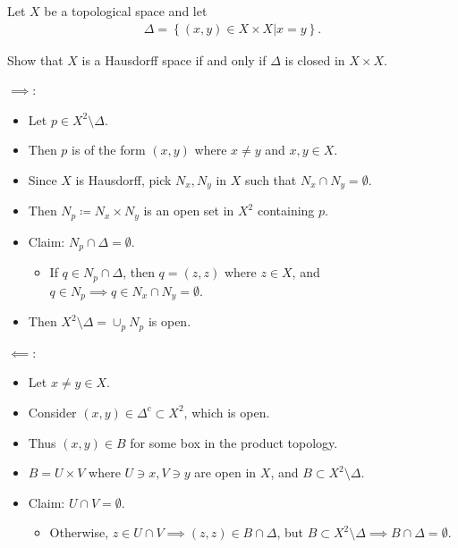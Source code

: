 \begin{problem}[?]

Let \(X\) be a topological space and let
\begin{align*}
\Delta = \left\{{(x, y) \in X \times X \mathrel{\Big|}x = y}\right\}
.\end{align*}

Show that \(X\) is a Hausdorff space if and only if \(\Delta\) is closed
in \(X \times X\).

\end{problem}

\begin{solution}

\envlist

\(\implies\):

\begin{itemize}
\tightlist
\item
  Let \(p\in X^2\setminus \Delta\).
\item
  Then \(p\) is of the form \((x, y)\) where \(x\neq y\) and
  \(x,y\in X\).
\item
  Since \(X\) is Hausdorff, pick \(N_x, N_y\) in \(X\) such that
  \(N_x \cap N_y = \emptyset\).
\item
  Then \(N_p\coloneqq N_x \times N_y\) is an open set in \(X^2\)
  containing \(p\).
\item
  Claim: \(N_p \cap\Delta = \emptyset\).

  \begin{itemize}
  \tightlist
  \item
    If \(q \in N_p \cap\Delta\), then \(q = (z, z)\) where \(z\in X\),
    and \(q\in N_p \implies q\in N_x \cap N_y = \emptyset\).
  \end{itemize}
\item
  Then \(X^2\setminus \Delta = \cup_p N_p\) is open.
\end{itemize}

\(\impliedby\):

\begin{itemize}
\tightlist
\item
  Let \(x\neq y\in X\).
\item
  Consider \((x, y) \in \Delta^c \subset X^2\), which is open.
\item
  Thus \((x, y) \in B\) for some box in the product topology.
\item
  \(B = U \times V\) where \(U\ni x, V\ni y\) are open in \(X\), and
  \(B \subset X^2\setminus \Delta\).
\item
  Claim: \(U\cap V = \emptyset\).

  \begin{itemize}
  \tightlist
  \item
    Otherwise, \(z\in U\cap V \implies (z, z) \in B\cap\Delta\), but
    \(B \subset X^2\setminus \Delta \implies B \cap\Delta = \emptyset\).
  \end{itemize}
\end{itemize}

\end{solution}

